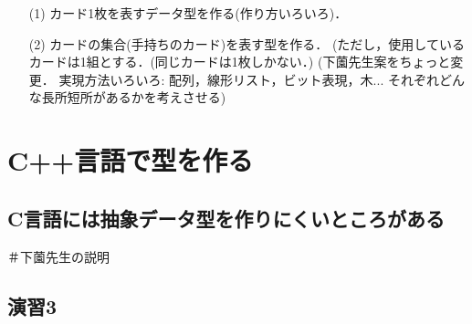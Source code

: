 \begin{quote}
\begin{verbatim}

\end{verbatim}
\end{quote}

\begin{quote}
\begin{verbatim}

\end{verbatim}
\end{quote}







\begin{enumerate}

 \item[(1)] カード1枚を表すデータ型を作る(作り方いろいろ)．

 \item[(2)] カードの集合(手持ちのカード)を表す型を作る．
(ただし，使用しているカードは1組とする．(同じカードは1枚しかない．)
(下薗先生案をちょっと変更．
実現方法いろいろ: 配列，線形リスト，ビット表現，木...
それぞれどんな長所短所があるかを考えさせる)

\end{enumerate}



\section{C++言語で型を作る}

\subsection{C言語には抽象データ型を作りにくいところがある}

＃下薗先生の説明

\subsection{演習3}


